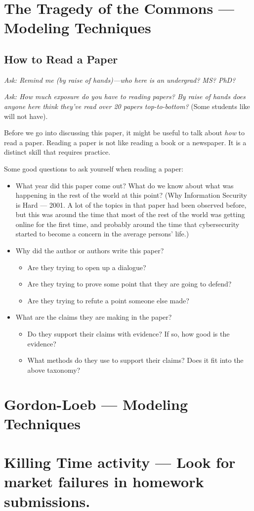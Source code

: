 \documentclass[11pt]{article}
\begin{document}
\section{The Tragedy of the Commons --- Modeling Techniques}

\subsection{How to Read a Paper}

{\it Ask: Remind me (by raise of hands)---who here is an undergrad? MS? PhD?}

{\it Ask: How much exposure do you have to reading papers? By raise of hands does anyone here think they've read over 20 papers top-to-bottom?} (Some students like will not have).

Before we go into discussing this paper, it might be useful to talk about {\it how} to read a paper. Reading a paper is not like reading a book or a newspaper. It is a distinct skill that requires practice.

Some good questions to ask yourself when reading a paper:

\begin{itemize}
    \item What year did this paper come out? What do we know about what was happening in the rest of the world at this point? (Why Information Security is Hard --- 2001. A lot of the topics in that paper had been observed before, but this was around the time that most of the rest of the world was getting online for the first time, and probably around the time that cybersecurity started to become a concern in the average persons' life.)
    \item Why did the author or authors write this paper?
    \begin{itemize}
        \item Are they trying to open up a dialogue?
        \item Are they trying to prove some point that they are going to defend?
        \item Are they trying to refute a point someone else made?
    \end{itemize}
    \item What are the claims they are making in the paper?
    \begin{itemize}
        \item Do they support their claims with evidence? If so, how good is the evidence?
        \item What methods do they use to support their claims? Does it fit into the above taxonomy?
    \end{itemize}
\end{itemize}


\section{Gordon-Loeb --- Modeling Techniques}


\section{Killing Time activity --- Look for market failures in homework submissions.}
\end{document}
